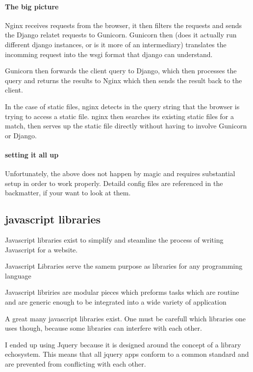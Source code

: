\paragraph{The big picture}

  Nginx receives requests from the browser, it then filters the requests and sends the Django relatet requests to Gunicorn.  Gunicorn then (does it actually run different django instances, or is it more of an intermediary) translates the incomming request into the wsgi format that django can understand.
  
  Gunicorn then forwards the client query to Django, which then processes the query and returns the results to Nginx which then sends the result back to the client.
  
  In the case of static files, nginx detects in the query string that the browser is trying to access a static file.  nginx then searches its existing static files for a match, then serves up the static file directly without having to involve Gunicorn or Django.
  
\paragraph{setting it all up}

  Unfortunately, the above does not happen by magic and requires substantial setup in order to work properly.  Detaild config files are referenced in the backmatter, if your want to look at them.


\subsection{javascript libraries}

Javascript libraries exist to simplify and steamline the process of writing Javascript for a website.

Javascript Libraries serve the samem purpose as libraries for any programming language

Javascript libriries are modular pieces which preforms tasks which are routine and are generic enough to be integrated into a wide variety of application

A great many javascript libraries exist.  One must be carefull which libraries one uses though, because some libraries can interfere with each other.  

I ended up using Jquery because it is designed around the concept of a library echosystem.  This means that all jquery apps conform to a common standard and are prevented from conflicting with each other.

